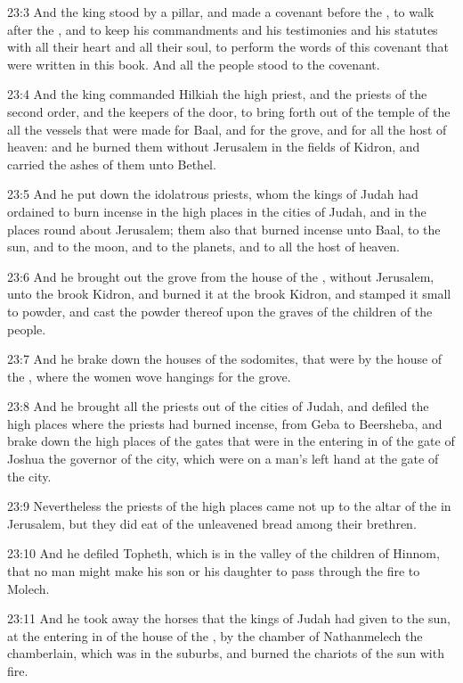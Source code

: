 23:3 And the king stood by a pillar, and made a covenant before the
\LORD, to walk after the \LORD, and to keep his commandments and his
testimonies and his statutes with all their heart and all their soul,
to perform the words of this covenant that were written in this book.
And all the people stood to the covenant.

23:4 And the king commanded Hilkiah the high priest, and the priests
of the second order, and the keepers of the door, to bring forth out
of the temple of the \LORD all the vessels that were made for Baal, and
for the grove, and for all the host of heaven: and he burned them
without Jerusalem in the fields of Kidron, and carried the ashes of
them unto Bethel.

23:5 And he put down the idolatrous priests, whom the kings of Judah
had ordained to burn incense in the high places in the cities of
Judah, and in the places round about Jerusalem; them also that burned
incense unto Baal, to the sun, and to the moon, and to the planets,
and to all the host of heaven.

23:6 And he brought out the grove from the house of the \LORD, without
Jerusalem, unto the brook Kidron, and burned it at the brook Kidron,
and stamped it small to powder, and cast the powder thereof upon the
graves of the children of the people.

23:7 And he brake down the houses of the sodomites, that were by the
house of the \LORD, where the women wove hangings for the grove.

23:8 And he brought all the priests out of the cities of Judah, and
defiled the high places where the priests had burned incense, from
Geba to Beersheba, and brake down the high places of the gates that
were in the entering in of the gate of Joshua the governor of the
city, which were on a man's left hand at the gate of the city.

23:9 Nevertheless the priests of the high places came not up to the
altar of the \LORD in Jerusalem, but they did eat of the unleavened
bread among their brethren.

23:10 And he defiled Topheth, which is in the valley of the children
of Hinnom, that no man might make his son or his daughter to pass
through the fire to Molech.

23:11 And he took away the horses that the kings of Judah had given to
the sun, at the entering in of the house of the \LORD, by the chamber
of Nathanmelech the chamberlain, which was in the suburbs, and burned
the chariots of the sun with fire.

